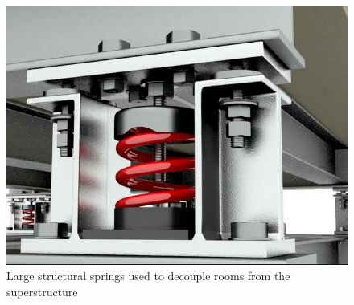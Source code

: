 \documentclass[10pt, twocolumn]{article}
\begin{document}
            \begin{figure}[H]
                \centering
                \includegraphics[scale = 0.5]{resources/springs.png}
                \caption{Large structural springs used to decouple rooms from the superstructure}
                \label{springs}
            \end{figure}
\end{document}
